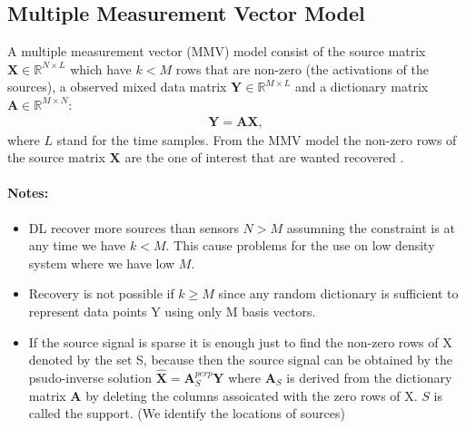\subsection{Multiple Measurement Vector Model}
A multiple measurement vector (MMV) model consist of the source matrix $\mathbf{X} \in \mathbb{R}^{N \times L}$ which have $k < M$ rows that are non-zero (the activations of the sources), a observed mixed data matrix $\mathbf{Y} \in \mathbb{R}^{M \times L}$ and a dictionary matrix $\mathbf{A} \in \mathbb{R}^{M \times N}$:
\begin{align*}
\mathbf{Y} = \mathbf{AX},
\end{align*}
where $L$ stand for the time samples. From the MMV model the non-zero rows of the source matrix $\mathbf{X}$ are the one of interest that are wanted recovered \cite[p. 11]{PHD}.


\paragraph{Notes:}
\begin{itemize}
\item DL recover more sources than sensors $N > M$ assumning the constraint is at any time we have $k < M$. This cause problems for the use on low density system where we have low $M$.
\item Recovery is not possible if $k \geq M$ since any random dictionary is sufficient to represent data points Y using only M basis vectors.
\item If the source signal is sparse it is enough just to find the non-zero rows of X denoted by the set S, because then the source signal can be obtained by the psudo-inverse solution $\hat{\mathbf{X}} = \mathbf{A}_S^{perp} \mathbf{Y}$ where $\mathbf{A}_S$ is derived from the dictionary matrix $\mathbf{A}$ by deleting the columns assoicated with the zero rows of X. $S$ is called the support. (We identify the locations of sources)
\end{itemize}